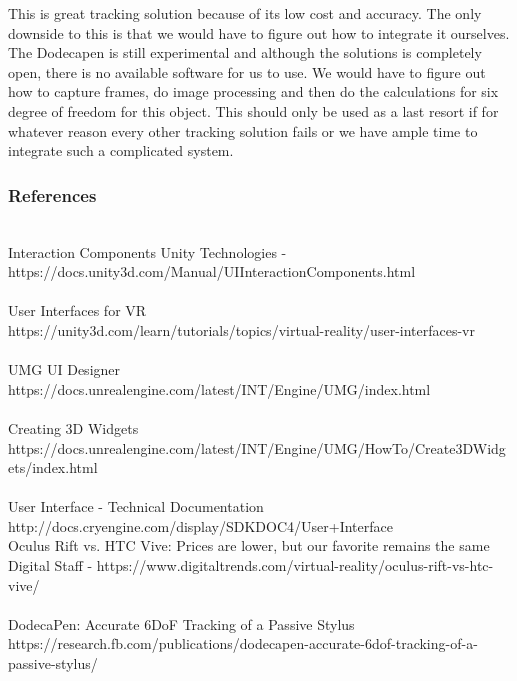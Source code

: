 \documentclass[onecolumn, draftclsnofoot,10pt, compsoc]{IEEEtran}
\begin{document}
This is great tracking solution because of its low cost and accuracy. The only downside to this is that we would have to figure out how to integrate it ourselves. The Dodecapen is still experimental and although the solutions is completely open, there is no available software for us to use. We would have to figure out how to capture frames, do image processing and then do the calculations for six degree of freedom for this object. This should only be used as a last resort if for whatever reason every other tracking solution fails or we have ample time to integrate such a complicated system.

\newpage
\subsubsection{References}
~\\ 
Interaction Components Unity Technologies - \\
https://docs.unity3d.com/Manual/UIInteractionComponents.html \\ \\

User Interfaces for VR\\
https://unity3d.com/learn/tutorials/topics/virtual-reality/user-interfaces-vr\\ \\


UMG UI Designer\\
https://docs.unrealengine.com/latest/INT/Engine/UMG/index.html \\ \\


Creating 3D Widgets \\
https://docs.unrealengine.com/latest/INT/Engine/UMG/HowTo/Create3DWidgets/index.html \\ \\

User Interface - Technical Documentation \\
http://docs.cryengine.com/display/SDKDOC4/User+Interface \\

Oculus Rift vs. HTC Vive: Prices are lower, but our favorite remains the same \\
Digital Staff - https://www.digitaltrends.com/virtual-reality/oculus-rift-vs-htc-vive/ \\ \\

DodecaPen: Accurate 6DoF Tracking of a Passive Stylus \\
https://research.fb.com/publications/dodecapen-accurate-6dof-tracking-of-a-passive-stylus/ \\
\end{document}
